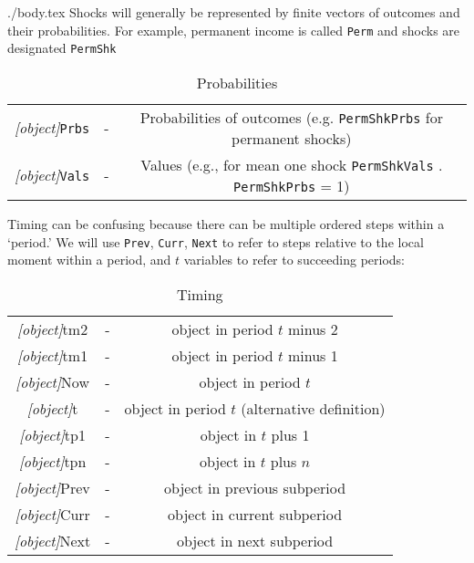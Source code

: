 \documentclass[12pt]{econtex}
\begin{document}
\begin{verbatimwrite}{./body.tex}
Shocks will generally be represented by finite vectors of outcomes and their probabilities.  For example, permanent income is called \texttt{Perm} and shocks are designated \texttt{PermShk}
\begin{table}[h]
	\centering
	\begin{tabular}{||>{\ttfamily}ccc||} 		
		\hline
   \textit{[object]}\texttt{Prbs} & - & Probabilities of outcomes (e.g. \texttt{PermShkPrbs} for permanent shocks) 
\\ \textit{[object]}\texttt{Vals} & - & Values (e.g., for mean one shock \texttt{PermShkVals} . \texttt{PermShkPrbs} = 1) 
\\ 	\hline
	\end{tabular}
	\caption{Probabilities}
	\label{table:Probabilities}
\end{table}	



Timing can be confusing because there can be multiple ordered steps 
within a `period.'  We will use \texttt{Prev}, \texttt{Curr}, \texttt{Next} to refer
to steps relative to the local moment within a period, and $t$ variables to refer to succeeding periods:
\begin{table}[h]
	\centering 
	\begin{tabular}{||>{\ttfamily}ccc||} 		
		\hline
   \textit{[object]}tm2 & - & object in period $t$ minus 2 
\\ \textit{[object]}tm1 & - & object in period $t$ minus 1 
\\ \textit{[object]}Now & - & object in period $t$
\\ \textit{[object]}t   & - & object in period $t$ (alternative definition)
\\ \textit{[object]}tp1 & - & object in $t$ plus 1 
\\ \textit{[object]}tpn & - & object in $t$ plus $n$ 
\\ \textit{[object]}Prev & - & object in previous subperiod
\\ \textit{[object]}Curr & - & object in current subperiod
\\ \textit{[object]}Next & - & object in next subperiod
\\	\hline
	\end{tabular}
	\caption{Timing}
	\label{table:Timing}
\end{table}	


\end{verbatimwrite}

\end{document}
